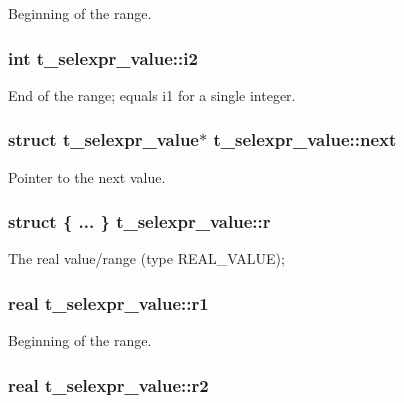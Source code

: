 \-Beginning of the range. \hypertarget{structt__selexpr__value_a90da0c62d5939089dfe14843e6703984}{
\subsubsection[{i2}]{\setlength{\rightskip}{0pt plus 5cm}int {\bf t\-\_\-selexpr\-\_\-value\-::i2}}}\label{structt__selexpr__value_a90da0c62d5939089dfe14843e6703984}
\-End of the range; equals {\ttfamily i1} for a single integer. \hypertarget{structt__selexpr__value_a6820b1e7fbf4c73d156bfdda0c713f8a}{
\subsubsection[{next}]{\setlength{\rightskip}{0pt plus 5cm}struct {\bf t\-\_\-selexpr\-\_\-value}$\ast$ {\bf t\-\_\-selexpr\-\_\-value\-::next}}}\label{structt__selexpr__value_a6820b1e7fbf4c73d156bfdda0c713f8a}
\-Pointer to the next value. \hypertarget{structt__selexpr__value_a67746561a9938d082658967c371e3950}{
\subsubsection[{r}]{\setlength{\rightskip}{0pt plus 5cm}struct \{ ... \}                     {\bf t\-\_\-selexpr\-\_\-value\-::r}}}\label{structt__selexpr__value_a67746561a9938d082658967c371e3950}
\-The real value/range ({\ttfamily type} \-R\-E\-A\-L\-\_\-\-V\-A\-L\-U\-E); \hypertarget{structt__selexpr__value_a48dc48f55a3c75e908d139dd49ae8b79}{
\subsubsection[{r1}]{\setlength{\rightskip}{0pt plus 5cm}real {\bf t\-\_\-selexpr\-\_\-value\-::r1}}}\label{structt__selexpr__value_a48dc48f55a3c75e908d139dd49ae8b79}
\-Beginning of the range. \hypertarget{structt__selexpr__value_a5db043b60415102189c3f4aa9881e634}{
\subsubsection[{r2}]{\setlength{\rightskip}{0pt plus 5cm}real {\bf t\-\_\-selexpr\-\_\-value\-::r2}}}\label{structt__selexpr__value_a5db043b60415102189c3f4aa9881e634}
